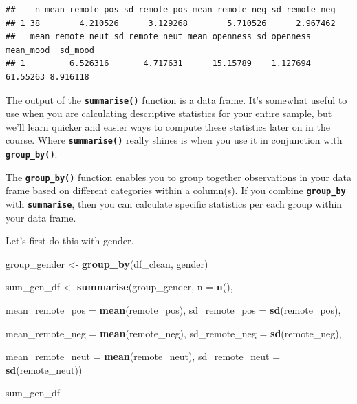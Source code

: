 \documentclass[
]{book}
\newenvironment{Shaded}{\begin{snugshade}}{\end{snugshade}}
\newcommand{\AttributeTok}[1]{\textcolor[rgb]{0.13,0.29,0.53}{#1}}
\newcommand{\FunctionTok}[1]{\textcolor[rgb]{0.13,0.29,0.53}{\textbf{#1}}}
\newcommand{\NormalTok}[1]{#1}
\newcommand{\OtherTok}[1]{\textcolor[rgb]{0.56,0.35,0.01}{#1}}
\begin{document}
\begin{verbatim}
##    n mean_remote_pos sd_remote_pos mean_remote_neg sd_remote_neg
## 1 38        4.210526      3.129268        5.710526      2.967462
##   mean_remote_neut sd_remote_neut mean_openness sd_openness mean_mood  sd_mood
## 1         6.526316       4.717631      15.15789    1.127694  61.55263 8.916118
\end{verbatim}

The output of the \textbf{\texttt{summarise()}} function is a data frame. It's somewhat useful to use when you are calculating descriptive statistics for your entire sample, but we'll learn quicker and easier ways to compute these statistics later on in the course. Where \textbf{\texttt{summarise()}} really shines is when you use it in conjunction with \textbf{\texttt{group\_by()}}.

The \textbf{\texttt{group\_by()}} function enables you to group together observations in your data frame based on different categories within a column(s). If you combine \textbf{\texttt{group\_by}} with \textbf{\texttt{summarise}}, then you can calculate specific statistics per each group within your data frame.

Let's first do this with gender.

\begin{Shaded}
\begin{Highlighting}[]
\NormalTok{group\_gender }\OtherTok{\textless{}{-}} \FunctionTok{group\_by}\NormalTok{(df\_clean, gender)}

\NormalTok{sum\_gen\_df }\OtherTok{\textless{}{-}} \FunctionTok{summarise}\NormalTok{(group\_gender, }
                        \AttributeTok{n =} \FunctionTok{n}\NormalTok{(), }
                        
                        \AttributeTok{mean\_remote\_pos =} \FunctionTok{mean}\NormalTok{(remote\_pos),}
                        \AttributeTok{sd\_remote\_pos =} \FunctionTok{sd}\NormalTok{(remote\_pos),}
          
                        \AttributeTok{mean\_remote\_neg =} \FunctionTok{mean}\NormalTok{(remote\_neg),}
                        \AttributeTok{sd\_remote\_neg =} \FunctionTok{sd}\NormalTok{(remote\_neg),}
          
                        \AttributeTok{mean\_remote\_neut =} \FunctionTok{mean}\NormalTok{(remote\_neut),}
                        \AttributeTok{sd\_remote\_neut =} \FunctionTok{sd}\NormalTok{(remote\_neut))}

\NormalTok{sum\_gen\_df}
\end{Highlighting}
\end{Shaded}
\end{document}

